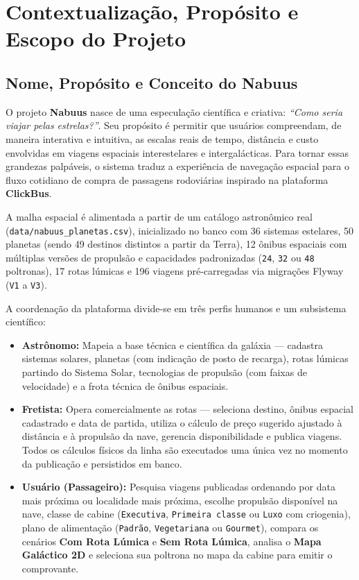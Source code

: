 \documentclass[12pt, a4paper]{article}
\begin{document}
\tableofcontents
\clearpage
\listoffigures
\newpage

\section{Contextualização, Propósito e Escopo do Projeto}

\subsection{Nome, Propósito e Conceito do Nabuus}
O projeto \textbf{Nabuus} nasce de uma especulação científica e criativa: \textit{``Como seria viajar pelas estrelas?''}. Seu propósito é permitir que usuários compreendam, de maneira interativa e intuitiva, as escalas reais de tempo, distância e custo envolvidas em viagens espaciais interestelares e intergalácticas. Para tornar essas grandezas palpáveis, o sistema traduz a experiência de navegação espacial para o fluxo cotidiano de compra de passagens rodoviárias inspirado na plataforma \textbf{ClickBus}.

A malha espacial é alimentada a partir de um catálogo astronômico real (\texttt{data/nabuus\_planetas.csv}), inicializado no banco com 36 sistemas estelares, 50 planetas (sendo 49 destinos distintos a partir da Terra), 12 ônibus espaciais com múltiplas versões de propulsão e capacidades padronizadas (\texttt{24}, \texttt{32} ou \texttt{48} poltronas), 17 rotas lúmicas e 196 viagens pré-carregadas via migrações Flyway (\texttt{V1} a \texttt{V3}).

A coordenação da plataforma divide-se em três perfis humanos e um subsistema científico:
\begin{itemize}
    \item \textbf{Astrônomo:} Mapeia a base técnica e científica da galáxia — cadastra sistemas solares, planetas (com indicação de posto de recarga), rotas lúmicas partindo do Sistema Solar, tecnologias de propulsão (com faixas de velocidade) e a frota técnica de ônibus espaciais.
    \item \textbf{Fretista:} Opera comercialmente as rotas — seleciona destino, ônibus espacial cadastrado e data de partida, utiliza o cálculo de preço sugerido ajustado à distância e à propulsão da nave, gerencia disponibilidade e publica viagens. Todos os cálculos físicos da linha são executados uma única vez no momento da publicação e persistidos em banco.
    \item \textbf{Usuário (Passageiro):} Pesquisa viagens publicadas ordenando por data mais próxima ou localidade mais próxima, escolhe propulsão disponível na nave, classe de cabine (\texttt{Executiva}, \texttt{Primeira classe} ou \texttt{Luxo} com criogenia), plano de alimentação (\texttt{Padrão}, \texttt{Vegetariana} ou \texttt{Gourmet}), compara os cenários \textbf{Com Rota Lúmica} e \textbf{Sem Rota Lúmica}, analisa o \textbf{Mapa Galáctico 2D} e seleciona sua poltrona no mapa da cabine para emitir o comprovante.
\end{itemize}
\end{document}
